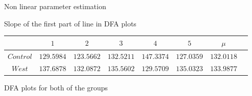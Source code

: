 \documentclass[t,12pt,english
\ifx\beamermode\undefined\else,\beamermode\fi
]{beamer}
\begin{document}
\begin{frame}{Non linear parameter estimation}
\begin{table}[!htbp]
\tiny
\centering
\tiny Slope of the first part of line in DFA plots
\begin{tabular}{ c c c c c c c c} 
\hline
&$1$&$2$&$3$&$4$&$5$&$\mu$\\
\hline
$Control$&$129.5984$&$123.5662$&$132.5211$&$147.3374$&$127.0359$&$132.0118$\\
$West$&$137.6878$&$132.0872$&$135.5602$&$129.5709$&$135.0323$&$133.9877$\\
\hline 
\end{tabular}
\end{table}

   
\end{frame}    



\begin{frame}{DFA plots for both of the groups}


\end{frame}
\end{document}
